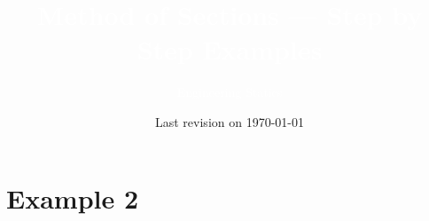 \documentclass[8pt, xcolor={svgnames, x11names}]{beamer}
\title[Method of Sections]{\huge \textcolor{white}{Method of Sections --- Step by Step Examples}}
\subtitle[]{\Large\textcolor{white}{Engineering Statics}}
\date{Last revision on \today}
\def\scale{1}
\begin{document}
\small
\begin{frame}[plain]
    \titlepage
\end{frame}
\section{Example 2}

%     
\end{document}
